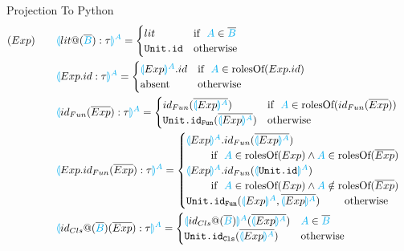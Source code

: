 \documentclass[11pt]{jarticle}
\newcommand{\projection}[2]{{\color{cyan}\llparenthesis}#1{\color{cyan}\rrparenthesis^#2}}
\begin{document}
Projection To Python
\begin{alignat*}{2}
  &(Exp)~~~ &&\projection{lit@(\overline{\color{cyan}{B}}):\tau}{A}=
  \begin{cases}
    lit & \text{if}~~ {\color{cyan}A} \in \overline{\color{cyan}{B}}\\
    \texttt{Unit.id} &\text{otherwise}
  \end{cases}\\
  &&&\projection{Exp.id:\tau}{A}=
  \begin{cases}
    \projection{Exp}{A}.id &\text{if}~~{\color{cyan}A} \in \text{rolesOf} (Exp.id)\\
    \text{absent} &\text{otherwise}
  \end{cases}\\
  &&&\projection{id_{Fun}(\overline{Exp}):\tau}{A} =
  \begin{cases}
    id_{Fun}(\overline{\projection{Exp}{A}}) &\text{if}~~ {\color{cyan}A} \in \text{rolesOf} (id_{Fun}(\overline{Exp}))\\
    \texttt{Unit.id}_\texttt{Fun}(\overline{\projection{Exp}{A}}) &\text{otherwise}
  \end{cases}\\
  &&&\projection{Exp.id_{Fun}(\overline{Exp}):\tau}{A}=
  \begin{cases}
    \projection{Exp}{A}.id_{Fun}(\overline{\projection{Exp}{A}}) \\
    ~~~~~~~\text{if}~~ {\color{cyan}A} \in \text{rolesOf}(Exp) \wedge {\color{cyan}A} \in \text{rolesOf}(\overline{Exp})\\
    \projection{Exp}{A}.id_{Fun}(\projection{\texttt{Unit.id}}{A}) \\
    ~~~~~~~\text{if}~~ {\color{cyan}A} \in \text{rolesOf}(Exp) \wedge {\color{cyan}A} \notin \text{rolesOf}(\overline{Exp})\\
    \texttt{Unit.id}_\texttt{Fun}(\projection{Exp}{A},\overline{\projection{Exp}{A}}) ~~~~~~~\text{otherwise}
  \end{cases}\\
  &&&\projection{id_{Cls}@(\overline{\color{cyan}B})(\overline{Exp}):\tau}{A}=
  \begin{cases}
    \projection{id_{Cls}@(\overline{\color{cyan}B})}{A} (\overline{\projection{Exp}{A}}) & {\color{cyan}A} \in \overline{\color{cyan}B}\\
    \texttt{Unit.id}_\texttt{Cls}(\overline{\projection{Exp}{A}}) &\text{otherwise}
  \end{cases}\\

\end{alignat*}
\end{document}
